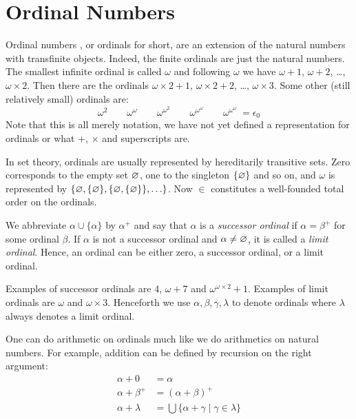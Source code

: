 

\section{Ordinal Numbers}\label{sec:ordinals}

Ordinal numbers \citep{cantor-15}, or ordinals for short, are an
extension of the natural numbers with transfinite objects. Indeed, the
finite ordinals are just the natural numbers. The smallest infinite
ordinal is called $\omega$ and following $\omega$ we have $\omega +
1$, $\omega + 2$, \ldots, $\omega \times 2$. Then there are the
ordinals $\omega \times 2 + 1$, $\omega \times 2 + 2$, \ldots, $\omega
\times 3$. Some other (still relatively small) ordinals are:
\begin{displaymath}
  \omega^2 \qquad
  \omega^\omega \qquad
  \omega^{\omega^2} \qquad
  \omega^{\omega^\omega} \qquad
  \omega^{\omega^{\omega^{\iddots}}} = \epsilon_0
\end{displaymath}
Note that this is all merely notation, we have not yet defined a
representation for ordinals or what $+$, $\times$ and superscripts
are.

In set theory, ordinals are usually represented by hereditarily transitive
sets. Zero corresponds to the empty set $\varnothing$, one to the
singleton $\{ \varnothing \}$ and so on, and $\omega$ is represented by
$\{ \varnothing, \{ \varnothing \}, \{ \varnothing, \{ \varnothing \} \} , \ldots
\}$. Now $\in$ constitutes a well-founded total order on the
ordinals.

We abbreviate $\alpha \cup \{ \alpha \}$ by $\alpha^+$ and say that
$\alpha$ is a \emph{successor ordinal} if $\alpha = \beta^+$ for some
ordinal $\beta$. If $\alpha$ is not a successor ordinal and $\alpha
\neq \varnothing$, it is called a \emph{limit ordinal}. Hence, an ordinal
can be either zero, a successor ordinal, or a limit ordinal.

Examples of successor ordinals are $4$, $\omega + 7$  and
$\omega^{\omega \times 2} + 1$. Examples of limit ordinals are
$\omega$ and $\omega \times 3$. Henceforth we use $\alpha, \beta,
\gamma, \lambda$ to denote ordinals where $\lambda$ always denotes a
limit ordinal.

One can do arithmetic on ordinals much like we do arithmetics on natural
numbers. For example, addition can be defined by recursion on the right
argument:
\begin{align*}
  \alpha + 0       &= \alpha\\
  \alpha + \beta^+ &= (\alpha + \beta)^+\\
  \alpha + \lambda &= \bigcup \{ \alpha + \gamma \; | \; \gamma \in \lambda \}
\end{align*}


